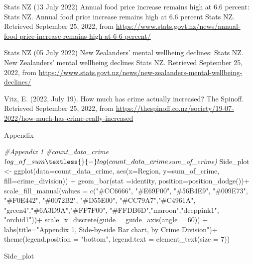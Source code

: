 \documentclass[
  10pt,
]{article}
\newenvironment{Shaded}{\begin{snugshade}}{\end{snugshade}}
\newcommand{\AttributeTok}[1]{\textcolor[rgb]{0.77,0.63,0.00}{#1}}
\newcommand{\CommentTok}[1]{\textcolor[rgb]{0.56,0.35,0.01}{\textit{#1}}}
\newcommand{\DecValTok}[1]{\textcolor[rgb]{0.00,0.00,0.81}{#1}}
\newcommand{\FunctionTok}[1]{\textcolor[rgb]{0.00,0.00,0.00}{#1}}
\newcommand{\NormalTok}[1]{#1}
\newcommand{\OtherTok}[1]{\textcolor[rgb]{0.56,0.35,0.01}{#1}}
\newcommand{\SpecialCharTok}[1]{\textcolor[rgb]{0.00,0.00,0.00}{#1}}
\newcommand{\StringTok}[1]{\textcolor[rgb]{0.31,0.60,0.02}{#1}}
\begin{document}
Stats NZ (13 July 2022) Annual food price increase remains high at 6.6
percent: Stats NZ. Annual food price increase remains high at 6.6
percent \textbar{} Stats NZ. Retrieved September 25, 2022, from
\url{https://www.stats.govt.nz/news/annual-food-price-increase-remains-high-at-6-6-percent/}

Stats NZ (05 July 2022) New Zealanders' mental wellbeing declines: Stats
NZ. New Zealanders' mental wellbeing declines \textbar{} Stats NZ.
Retrieved September 25, 2022, from
\url{https://www.stats.govt.nz/news/new-zealanders-mental-wellbeing-declines/}

Vitz, E. (2022, July 19). How much has crime actually increased? The
Spinoff. Retrieved September 25, 2022, from
\url{https://thespinoff.co.nz/society/19-07-2022/how-much-has-crime-really-increased}

Appendix

\begin{Shaded}
\begin{Highlighting}[]
\CommentTok{\#Appendix 1}
\CommentTok{\#count\_data\_crime$log\_of\_sum\textless{}{-}log(count\_data\_crime$sum\_of\_crime)}
\NormalTok{Side\_plot }\OtherTok{\textless{}{-}} \FunctionTok{ggplot}\NormalTok{(}\AttributeTok{data=}\NormalTok{count\_data\_crime, }\FunctionTok{aes}\NormalTok{(}\AttributeTok{x=}\NormalTok{Region, }\AttributeTok{y=}\NormalTok{sum\_of\_crime, }\AttributeTok{fill=}\NormalTok{crime\_division)) }\SpecialCharTok{+}
  \FunctionTok{geom\_bar}\NormalTok{(}\AttributeTok{stat =}\StringTok{\textquotesingle{}identity\textquotesingle{}}\NormalTok{, }\AttributeTok{position=}\FunctionTok{position\_dodge}\NormalTok{())}\SpecialCharTok{+}
  \FunctionTok{scale\_fill\_manual}\NormalTok{(}\AttributeTok{values =} \FunctionTok{c}\NormalTok{(}\StringTok{"\#CC6666"}\NormalTok{, }\StringTok{"\#E69F00"}\NormalTok{, }\StringTok{"\#56B4E9"}\NormalTok{, }\StringTok{"\#009E73"}\NormalTok{, }\StringTok{"\#F0E442"}\NormalTok{, }
                               \StringTok{"\#0072B2"}\NormalTok{, }\StringTok{"\#D55E00"}\NormalTok{, }\StringTok{"\#CC79A7"}\NormalTok{,}\StringTok{"\#C4961A"}\NormalTok{,}
                               \StringTok{"green4"}\NormalTok{,}\StringTok{"\#6A3D9A"}\NormalTok{,}\StringTok{"\#FF7F00"}\NormalTok{,}
                               \StringTok{"\#FFDB6D"}\NormalTok{,}\StringTok{"maroon"}\NormalTok{,}\StringTok{"deeppink1"}\NormalTok{, }\StringTok{"orchid1"}\NormalTok{))}\SpecialCharTok{+}
  \FunctionTok{scale\_x\_discrete}\NormalTok{(}\AttributeTok{guide =} \FunctionTok{guide\_axis}\NormalTok{(}\AttributeTok{angle =} \DecValTok{60}\NormalTok{)) }\SpecialCharTok{+}
  \FunctionTok{labs}\NormalTok{(}\AttributeTok{title=}\StringTok{"Appendix 1, Side{-}by{-}side Bar chart, by Crime Division"}\NormalTok{)}\SpecialCharTok{+}
  \FunctionTok{theme}\NormalTok{(}\AttributeTok{legend.position =} \StringTok{"bottom"}\NormalTok{, }\AttributeTok{legend.text =} \FunctionTok{element\_text}\NormalTok{(}\AttributeTok{size =} \DecValTok{7}\NormalTok{))}


\NormalTok{Side\_plot }
\end{Highlighting}
\end{Shaded}
\end{document}
